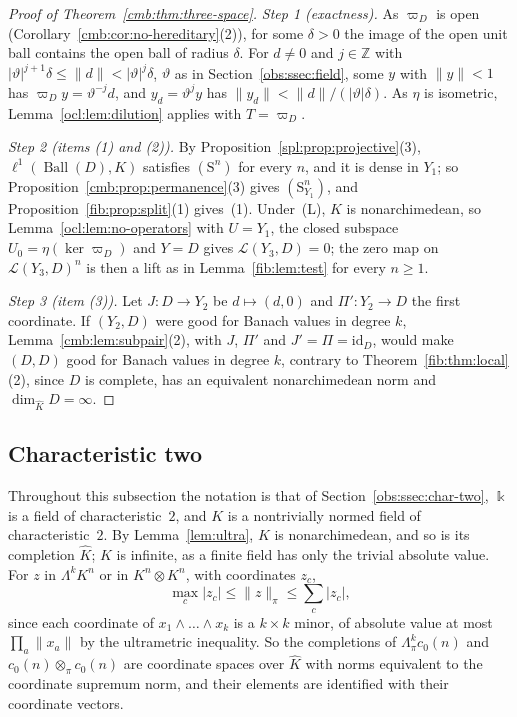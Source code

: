 \documentclass[11pt]{amsart}
\theoremstyle{definition}
\theoremstyle{remark}
\numberwithin{equation}{section}
\newcommand{\Z}{\mathbb Z}
\newcommand{\cL}{\mathcal L}
\newcommand{\id}{\mathrm{id}}
\newcommand{\abs}[1]{\lvert #1\rvert}
\newcommand{\norm}[1]{\lVert #1\rVert}
\newcommand{\Kh}{\widehat K}
\theoremstyle{plain}
\theoremstyle{definition}
\theoremstyle{plain}
\begin{document}
\begin{proof}[Proof of Theorem~\ref{cmb:thm:three-space}]
\emph{Step 1 (exactness).} As $\varpi_D$ is open (Corollary~\ref{cmb:cor:no-hereditary}(2)), for some $\delta>0$ the
image of the open unit ball contains the open ball of radius $\delta$. For $d\ne0$ and $j\in\Z$ with
$\abs\vartheta^{j+1}\delta\le\norm d<\abs\vartheta^j\delta$, $\vartheta$ as in Section~\ref{obs:ssec:field}, some $y$ with
$\norm y<1$ has $\varpi_Dy=\vartheta^{-j}d$, and $y_d=\vartheta^jy$ has $\norm{y_d}<\norm d/(\abs\vartheta\delta)$. As
$\eta$ is isometric, Lemma~\ref{ocl:lem:dilution} applies with $T=\varpi_D$.

\emph{Step 2 (items (1) and (2)).} By Proposition~\ref{spl:prop:projective}(3), $\ell^1(\operatorname{Ball}(D),K)$
satisfies $(\mathrm S^n)$ for every $n$, and it is dense in $Y_1$; so Proposition~\ref{cmb:prop:permanence}(3) gives
$(\mathrm S^n_{Y_1})$, and Proposition~\ref{fib:prop:split}(1) gives~(1). Under~(L), $K$ is nonarchimedean, so
Lemma~\ref{ocl:lem:no-operators} with $U=Y_1$, the closed subspace $U_0=\eta(\ker\varpi_D)$ and $Y=D$ gives
$\cL(Y_3,D)=0$; the zero map on $\cL(Y_3,D)^n$ is then a lift as in Lemma~\ref{fib:lem:test} for every $n\ge1$.

\emph{Step 3 (item (3)).} Let $J\colon D\to Y_2$ be $d\mapsto(d,0)$ and $\Pi'\colon Y_2\to D$ the first coordinate. If
$(Y_2,D)$ were good for Banach values in degree $k$, Lemma~\ref{cmb:lem:subpair}(2), with $J$, $\Pi'$ and
$J'=\Pi=\id_D$, would make $(D,D)$ good for Banach values in degree $k$, contrary to Theorem~\ref{fib:thm:local}(2),
since $D$ is complete, has an equivalent nonarchimedean norm and $\dim_{\Kh}D=\infty$.
\end{proof}

\subsection{Characteristic two}\label{ocl:ssec:char-two}

Throughout this subsection the notation is that of Section~\ref{obs:ssec:char-two}, $\Bbbk$ is a field of
characteristic~$2$, and $K$ is a nontrivially normed field of characteristic~$2$. By Lemma~\ref{lem:ultra}, $K$ is
nonarchimedean, and so is its completion $\widehat K$; $K$ is infinite, as a finite field has only the trivial absolute
value. For $z$ in $\Lambda^kK^{n}$ or in $K^{n}\otimes K^{n}$, with coordinates $z_c$,
\begin{equation}\label{ocl:eq:coordinates}
\max_c\abs{z_c}\le\norm z_\pi\le\sum_c\abs{z_c},
\end{equation}
since each coordinate of $x_1\wedge\dots\wedge x_k$ is a $k\times k$ minor, of absolute value at most $\prod_a\norm{x_a}$
by the ultrametric inequality. So the completions of $\Lambda^k_\pi c_0(n)$ and $c_0(n)\otimes_\pi c_0(n)$ are coordinate
spaces over $\widehat K$ with norms equivalent to the coordinate supremum norm, and their elements are identified with
their coordinate vectors.
\end{document}
